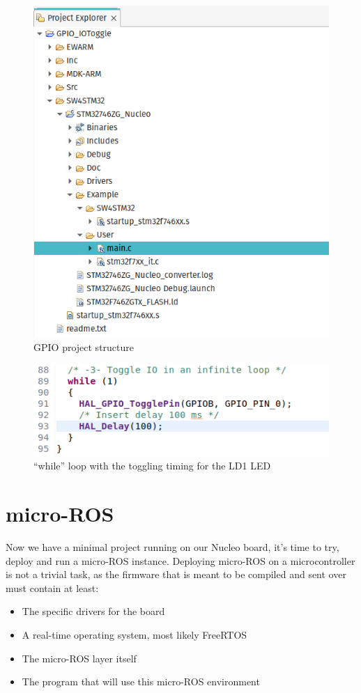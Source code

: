 \documentclass[10pt]{article}
\begin{document}
\begin{figure}[h]
  \centering
  \includegraphics[width=.9\textwidth]{./img/tree.png}
  \caption{GPIO project structure}
  \label{fig:tree}
\end{figure}

\begin{figure}[!h]
  \centering
  \includegraphics[width=.9\textwidth]{./img/toggle_led.png}
  \caption{``while'' loop with the toggling timing for the LD1 LED}
  \label{fig:toggle_led}
\end{figure}

\pagebreak
\section{micro-ROS}
\label{sec:micro-ros}
Now we have a minimal project running on our Nucleo board, it's time to try, deploy and run a micro-ROS instance.
Deploying micro-ROS on a microcontroller is not a trivial task, as the firmware that is meant to be compiled and sent over must contain at least:
\begin{itemize}
\item The specific drivers for the board
\item A real-time operating system, most likely FreeRTOS
\item The micro-ROS layer itself
\item The program that will use this micro-ROS environment
\end{itemize}
\end{document}
